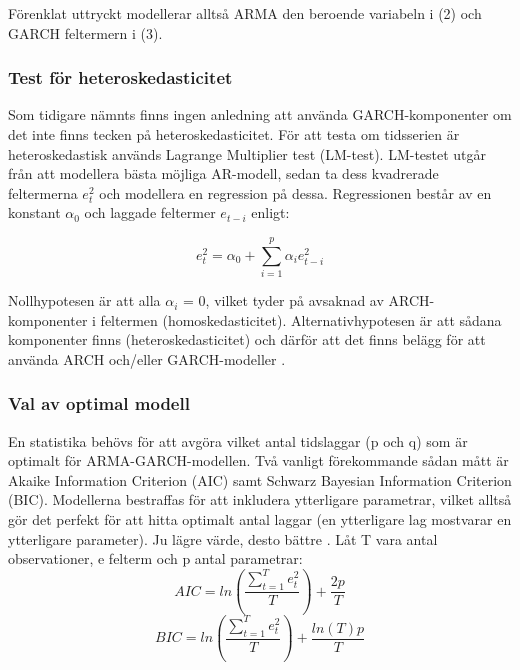 \documentclass[12pt]{article}
\begin{document}
Förenklat uttryckt modellerar alltså ARMA den beroende variabeln i (2) och GARCH feltermern i (3).

\subsubsection{Test för heteroskedasticitet}
Som tidigare nämnts finns ingen anledning att använda GARCH-komponenter om det inte finns tecken på heteroskedasticitet. För att testa om tidsserien är heteroskedastisk används Lagrange Multiplier test (LM-test). LM-testet utgår från att modellera bästa möjliga AR-modell, sedan ta dess kvadrerade feltermerna \(e_t^2\) och modellera en regression på dessa. Regressionen består av en konstant \(\alpha_0\) och laggade feltermer \(e_{t-i}\) enligt:

\begin{equation}
    e_t^2=\alpha_0+\sum_{i=1}^{p}\alpha_ie_{t-i}^2
\end{equation}

Nollhypotesen är att alla \(\alpha_i\) = 0, vilket tyder på avsaknad av ARCH-komponenter i feltermen (homoskedasticitet). Alternativhypotesen är att sådana komponenter finns (heteroskedasticitet) och därför att det finns belägg för att använda ARCH och/eller GARCH-modeller \parencite{engle1982autoregressive}. \par

\subsubsection{Val av optimal modell}
En statistika behövs för att avgöra vilket antal tidslaggar (p och q) som är optimalt för ARMA-GARCH-modellen. Två vanligt förekommande sådan mått är Akaike Information Criterion (AIC) samt Schwarz Bayesian Information Criterion (BIC). Modellerna bestraffas för att inkludera ytterligare parametrar, vilket alltså gör det perfekt för att hitta optimalt antal laggar (en ytterligare lag mostvarar en ytterligare parameter). Ju lägre värde, desto bättre \parencite{montgomery2015forecasting}. Låt T vara antal observationer, e felterm och p antal parametrar:
\begin{equation}
    AIC = ln\left( \frac{\sum_{t=1}^{T}e^2_t}{T} \right)+\frac{2p}{T}
\end{equation}
\begin{equation}
    BIC = ln\left( \frac{\sum_{t=1}^{T}e^2_t}{T} \right)+\frac{ln(T)p}{T}
\end{equation}
\end{document}
